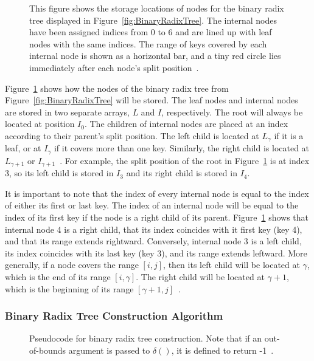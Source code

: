 \documentclass{sig-alternate}
\begin{document}
\begin{figure}
\centering
{}
\caption{This figure shows the storage locations of nodes for the binary radix tree displayed in Figure~\ref{fig:BinaryRadixTree}. The internal nodes have been assigned indices from 0 to 6 and are lined up with leaf nodes with the same indices. The range of keys covered by each internal node is shown as a horizontal bar, and a tiny red circle lies immediately after each node's split position~\cite{Karras:2012}.}
\label{fig:BinaryRadixArrays}
\end{figure}

Figure~\ref{fig:BinaryRadixArrays} shows how the nodes of the binary radix tree from Figure~\ref{fig:BinaryRadixTree} will be stored. The leaf nodes and internal nodes are stored in two separate arrays, $L$ and $I$, respectively. The root will always be located at position $I_{0}$. The children of internal nodes are placed at an index according to their parent's split position. The left child is located at $L_{\gamma}$ if it is a leaf, or at $I_{\gamma}$ if it covers more than one key. Similarly, the right child is located at $L_{\gamma+1}$ or $I_{\gamma+1}$~\cite{Karras:2012}. For example, the split position of the root in Figure~\ref{fig:BinaryRadixArrays} is at index 3, so its left child is stored in $I_{3}$ and its right child is stored in $I_{4}$.

It is important to note that the index of every internal node is equal to the index of either its first or last key. The index of an internal node will be equal to the index of its first key if the node is a right child of its parent. Figure~\ref{fig:BinaryRadixArrays} shows that internal node 4 is a right child, that its index coincides with it first key (key 4), and that its range extends rightward. Conversely, internal node 3 is a left child, its index coincides with its last key (key 3), and its range extends leftward. More generally, if a node covers the range $[i,j]$, then its left child will be located at $\gamma$, which is the end of its range $[i,\gamma]$. The right child will be located at $\gamma+1$, which is the beginning of its range $[\gamma+1,j]$~\cite{Karras:2012}.

\subsubsection{Binary Radix Tree Construction Algorithm}
\label{sec:algorithm}

\begin{figure}
\centering
{}
\caption{Pseudocode for binary radix tree construction. Note that if an out-of-bounds argument is passed to $\delta()$, it is defined to return -1~\cite{Karras:2012}.}
\label{fig:PseudoCode}
\end{figure}
\end{document}
